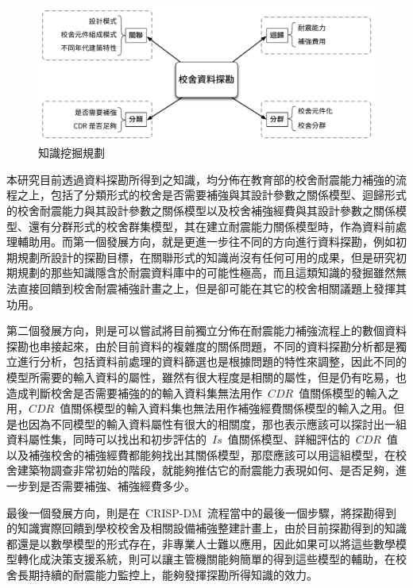 \begin{figure}[hbtp]
  \begin{center}
    \includegraphics[width=1.0\textwidth]{figures/big-picture.pdf}
    \caption{知識挖掘規劃} 
    \label{fig:bigpicture}
  \end{center}
\end{figure}

本研究目前透過資料探勘所得到之知識，均分佈在教育部的校舍耐震能力補強的流程之上，包括了分類形式的校舍是否需要補強與其設計參數之關係模型、迴歸形式的校舍耐震能力與其設計參數之關係模型以及校舍補強經費與其設計參數之關係模型、還有分群形式的校舍群集模型，其在建立耐震能力關係模型時，作為資料前處理輔助用。而第一個發展方向，就是更進一步往不同的方向進行資料探勘，例如初期規劃所設計的探勘目標，在關聯形式的知識尚沒有任何可用的成果，但是研究初期規劃的那些知識隱含於耐震資料庫中的可能性極高，而且這類知識的發掘雖然無法直接回饋到校舍耐震補強計畫之上，但是卻可能在其它的校舍相關議題上發揮其功用。



第二個發展方向，則是可以嘗試將目前獨立分佈在耐震能力補強流程上的數個資料探勘也串接起來，由於目前資料的複雜度的關係問題，不同的資料探勘分析都是獨立進行分析，包括資料前處理的資料篩選也是根據問題的特性來調整，因此不同的模型所需要的輸入資料的屬性，雖然有很大程度是相關的屬性，但是仍有吃易，也造成判斷校舍是否需要補強的的輸入資料集無法用作~$CDR$~值關係模型的輸入之用，$CDR$~值關係模型的輸入資料集也無法用作補強經費關係模型的輸入之用。但是也因為不同模型的輸入資料屬性有很大的相關度，那也表示應該可以探討出一組資料屬性集，同時可以找出和初步評估的~$Is$~值關係模型、詳細評估的~$CDR$~值以及補強校舍的補強經費都能夠找出其關係模型，那麼應該可以用這組模型，在校舍建築物調查非常初始的階段，就能夠推估它的耐震能力表現如何、是否足夠，進一步到是否需要補強、補強經費多少。

最後一個發展方向，則是在~CRISP-DM~流程當中的最後一個步驟，將探勘得到的知識實際回饋到學校校舍及相關設備補強整建計畫上，由於目前探勘得到的知識都還是以數學模型的形式存在，非專業人士難以應用，因此如果可以將這些數學模型轉化成決策支援系統，則可以讓主管機關能夠簡單的得到這些模型的輔助，在校舍長期持續的耐震能力監控上，能夠發揮探勘所得知識的效力。





